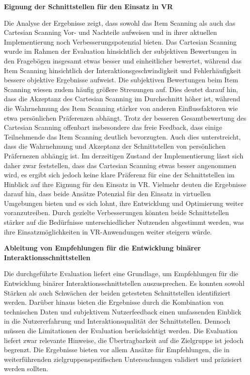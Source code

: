 \textbf{Eignung der Schnittstellen für den Einsatz in VR}

Die Analyse der Ergebnisse zeigt, dass sowohl das Item Scanning als auch das Cartesian Scanning Vor- und Nachteile aufweisen und in ihrer aktuellen Implementierung noch Verbesserungspotenzial bieten. Das Cartesian Scanning wurde im Rahmen der Evaluation hinsichtlich der subjektiven Bewertungen in den Fragebögen insgesamt etwas besser und einheitlicher bewertet, während das Item Scanning hinsichtlich der Interaktionsgeschwindigkeit und Fehlerhäufigkeit bessere objektive Ergebnisse aufweist. Die subjektiven Bewertungen beim Item Scanning wiesen zudem häufig größere Streuungen auf. Dies deutet darauf hin, dass die Akzeptanz des Cartesian Scanning im Durchschnitt höher ist, während die Wahrnehmung des Item Scanning stärker von anderen Einflussfaktoren wie etwa persönlichen Präferenzen abhängt.
Trotz der besseren Gesamtbewertung des Cartesian Scanning offenbart insbesondere das freie Feedback, dass einige Teilnehmende das Item Scanning deutlich bevorzugten. Auch dies unterstreicht, dass die Wahrnehmung und Akzeptanz der Schnittstellen von persönlichen Präfernezen abhängig ist.
Im derzeitigen Zustand der Implementierung lässt sich daher zwar feststellen, dass das Cartesian Scanning etwas besser angenommen wird, es ergibt sich jedoch keine klare Präferenz für eine der Schnittstellen im Hinblick auf ihre Eignung für den Einsatz in VR. Vielmehr deuten die Ergebnisse darauf hin, dass beide Ansätze Potenzial für den Einsatz in virtuellen Umgebungen bieten und es sich lohnt, ihre Entwicklung und Optimierung weiter voranzutreiben. Durch gezielte Verbesserungen könnten beide Schnittstellen stärker auf die Bedürfnisse unterschiedlicher Nutzenden abgestimmt werden, was ihre Einsatzmöglichkeiten in VR-Anwendungen weiter steigern würde.

\textbf{Ableitung von Empfehlungen für die Entwicklung binärer Interaktionsschnittstellen}

Die durchgeführte Evaluation liefert eine Grundlage, um Empfehlungen für die Entwicklung binärer Interaktionsschnittstellen auszusprechen. Es konnten sowohl Stärken als auch Schwächen der beiden getesteten Schnittstellen identifiziert werden. Darüber hinaus bieten die Ergebnisse durch die Kombination von technischen Daten und subjektivem Nutzerfeedback einen umfassenden Einblick in die Nutzererfahrung und Interaktionsqualität der Schnittstellen. Dennoch müssen die Limitationen der Evaluation berücksichtigt werden. Die Evaluation liefert zwar relevante Hinweise, die Übertragbarkeit auf die Zielgruppe ist jedoch begrenzt. Die Ergebnisse bieten vor allem Ansätze für Empfehlungen, die in weiterführenden zielgruppenspezifischen Untersuchungen validiert und präzisiert werden sollten. 

